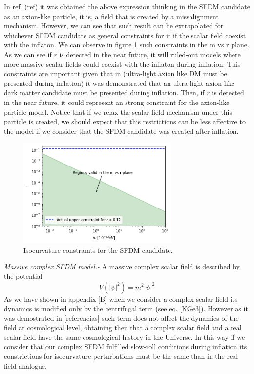\documentclass[twocolumn,           %
               showpacs,            %
               preprintnumbers,     %
               aps,                 %
               prl,          	    %
               letterpaper,             %
               superscriptaddress,      %
               nofootinbib,         %
               tightenlines,        %
               floats,floatfix      %
               ,usenatbib,
               ]{revtex4-1}
\begin{document}
In ref. (ref) it was obtained the above expression thinking in the SFDM candidate as an axion-like particle, it is, a field that is created by a missalignment mechanism. However, we can see that such result can be extrapolated for whichever SFDM candidate as general constraints for it if the scalar field coexist with the inflaton. We can observe in figure \ref{constraintsSFDM} such constraints in the m vs r plane. As we can see if $r$ is detected in the near future, it will ruled-out models where more massive scalar fields could coexist with the inflaton during inflation. This constraints are important given that in (ultra-light axion like DM must be presented during inflation) it was demonstrated that an ultra-light axion-like dark matter candidate must be presented during inflation. Then, if $r$ is detected in the near future, it could represent an strong constraint for the axion-like particle model. Notice that if we relax the scalar field mechanism under this particle is created, we should expect that this restrictions can be less affective to the model if we consider that the SFDM candidate was created after inflation. 
\begin{figure}
\includegraphics[width=8cm]{SFDMconstraints.png}
\caption{Isocurvature constraints for the SFDM candidate.}\label{constraintsSFDM}
\end{figure}

\textit{Massive complex SFDM model.-} A massive complex scalar field is described by the potential
\begin{equation}
V(|\psi|^2)= m^2|\psi|^2
\end{equation}
As we have shown in appendix [B] when we consider a complex scalar field its dynamics is modified only by the centrifugal term (see eq. \eqref{KGe3}). However as it was demostrated in [referencias] such term does not affect the dynamics of the field at cosmological level, obtaining then that a complex scalar field and a real scalar field have the same cosmological history in the Universe. In this way if we consider that our complex SFDM fulfilled slow-roll conditions during inflation its constrictions for isocurvature perturbations must be the same than in the real field analogue. 
\end{document}
